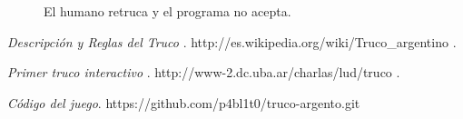 \documentclass[12pt,a4paper]{article}
\begin{document}
\begin{figure}
\noindent {}
\caption {El humano retruca y el programa no acepta.}
\end{figure}

\clearpage
\begin{thebibliography}{9}

	 \emph{Descripci\'on y Reglas del Truco }. 
	http://es.wikipedia.org/wiki/Truco\_argentino .

	 \emph{Primer truco interactivo }. 
	http://www-2.dc.uba.ar/charlas/lud/truco .

	 \emph{C\'odigo del juego}.
	https://github.com/p4bl1t0/truco-argento.git



\end{thebibliography}
\end{document}
